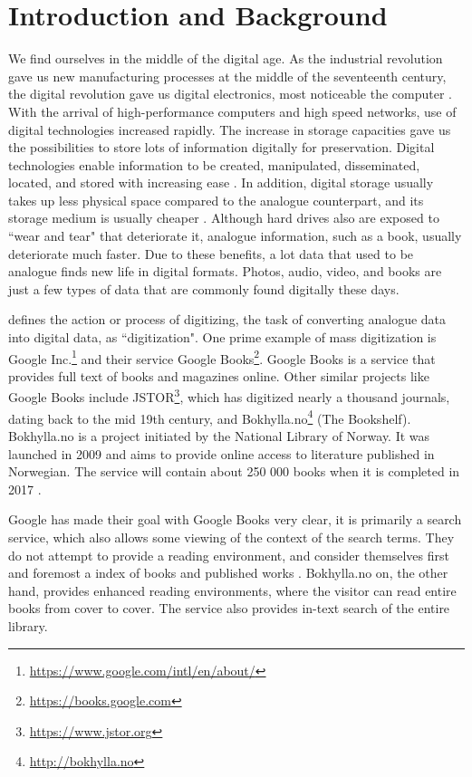 
\chapter{Introduction and Background}
\label{ch:introduction}
We find ourselves in the middle of the digital age. As the industrial revolution gave us new manufacturing processes at the middle of the seventeenth century, the digital revolution gave us digital electronics, most noticeable the computer \citep{freeman2001time}. With the arrival of high-performance computers and high speed networks, use of digital technologies increased rapidly. The increase in storage capacities gave us the possibilities to store lots of information digitally for preservation. Digital technologies enable information to be created, manipulated, disseminated, located, and stored with increasing ease \citep{lee2002state}. In addition, digital storage usually takes up less physical space compared to the analogue counterpart, and its storage medium is usually cheaper \citep{morris2003evolution}. Although hard drives also are exposed to ``wear and tear" that deteriorate it, analogue information, such as a book, usually deteriorate much faster. Due to these benefits, a lot data that used to be analogue finds new life in digital formats. Photos, audio, video, and books are just a few types of data that are commonly found digitally these days.

\citep{misc-oed-digitization} defines the action or process of digitizing, the task of converting analogue data into digital data, as ``digitization". One prime example of mass digitization is Google Inc.\footnote{\url{https://www.google.com/intl/en/about/}} and their service Google Books\footnote{\url{https://books.google.com}}. Google Books is a service that provides full text of books and magazines online. Other similar projects like Google Books include JSTOR\footnote{\url{https://www.jstor.org}}, which has digitized nearly a thousand journals, dating back to the mid 19th century, and Bokhylla.no\footnote{\url{http://bokhylla.no}} (The Bookshelf). Bokhylla.no is a project initiated by the National Library of Norway. It was launched in 2009 and aims to provide online access to literature published in Norwegian. The service will contain about 250 000 books when it is completed in 2017 \citep{misc-nb-digial-library}.

Google has made their goal with Google Books very clear, it is primarily a search service, which also allows some viewing of the context of the search terms. They do not attempt to provide a reading environment, and consider themselves first and foremost a index of books and published works \citep{coyle2006mass}. Bokhylla.no on, the other hand, provides enhanced reading environments, where the visitor can read entire books from cover to cover. The service also provides in-text search of the entire library. 

